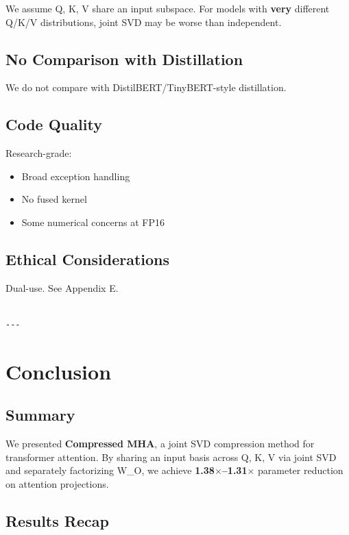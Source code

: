 We assume Q, K, V share an input subspace. For models with \textbf{very} different 
Q/K/V distributions, joint SVD may be worse than independent.

\subsection{No Comparison with Distillation}

We do not compare with DistilBERT/TinyBERT-style distillation.

\subsection{Code Quality}

Research-grade:
\begin{itemize}
\item Broad exception handling
\item No fused kernel
\item Some numerical concerns at FP16

\end{itemize}
\subsection{Ethical Considerations}

Dual-use. See Appendix E.
\begin{lstlisting}

---
\end{lstlisting}

\section{Conclusion}

\subsection{Summary}

We presented \textbf{Compressed MHA}, a joint SVD compression method for 
transformer attention. By sharing an input basis across Q, K, V via joint 
SVD and separately factorizing W\_O, we achieve \textbf{1.38$\times$--1.31$\times$} 
parameter reduction on attention projections.

\subsection{Results Recap}

